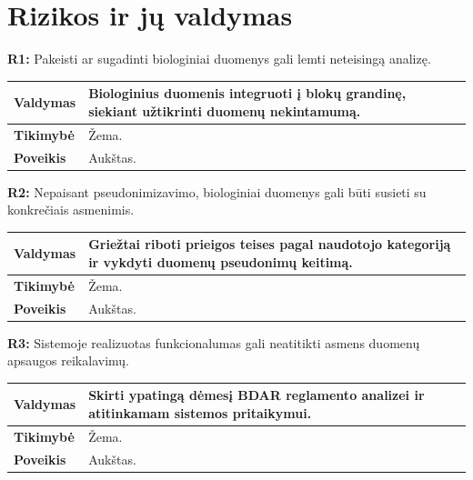 \documentclass[12pt]{article}
\begin{document}
\newpage

\section{Rizikos ir jų valdymas}
\noindent \textbf{R1:} Pakeisti ar sugadinti biologiniai duomenys gali lemti
neteisingą analizę.

\label{sec:R1}
\begin{table}[htb!]
    \captionsetup{justification=centering}
    \vskip -10pt
    \begin{tabular}{|m{3cm}|m{13.7cm}|}
        \hline
        \raggedleft \textbf{\cellcolor{deepchampagne}Valdymas} &
        Biologinius duomenis integruoti į blokų grandinę, siekiant užtikrinti
        duomenų nekintamumą. \\
        \hline
        \raggedleft \textbf{\cellcolor{deepchampagne}Tikimybė} & Žema. \\
        \hline
        \raggedleft \textbf{\cellcolor{deepchampagne}Poveikis} & Aukštas. \\
        \hline
    \end{tabular}
\end{table}

\noindent \textbf{R2:} Nepaisant pseudonimizavimo, biologiniai duomenys gali
būti susieti su konkrečiais asmenimis.

\label{sec:R2}
\begin{table}[htb!]
    \captionsetup{justification=centering}
    \vskip -10pt
    \begin{tabular}{|m{3cm}|m{13.7cm}|}
        \hline
        \raggedleft \textbf{\cellcolor{deepchampagne}Valdymas} &
        Griežtai riboti prieigos teises pagal naudotojo kategoriją ir vykdyti
        duomenų pseudonimų keitimą. \\
        \hline
        \raggedleft \textbf{\cellcolor{deepchampagne}Tikimybė} & Žema. \\
        \hline
        \raggedleft \textbf{\cellcolor{deepchampagne}Poveikis} & Aukštas. \\
        \hline
    \end{tabular}
\end{table}

\noindent \textbf{R3:} Sistemoje realizuotas funkcionalumas gali neatitikti
asmens duomenų apsaugos reikalavimų.

\label{sec:R3}
\begin{table}[htb!]
    \captionsetup{justification=centering}
    \vskip -10pt
    \begin{tabular}{|m{3cm}|m{13.7cm}|}
        \hline
        \raggedleft \textbf{\cellcolor{deepchampagne}Valdymas} &
        Skirti ypatingą dėmesį BDAR reglamento analizei ir atitinkamam sistemos
        pritaikymui. \\
        \hline
        \raggedleft \textbf{\cellcolor{deepchampagne}Tikimybė} & Žema. \\
        \hline
        \raggedleft \textbf{\cellcolor{deepchampagne}Poveikis} & Aukštas. \\
        \hline
    \end{tabular}
\end{table}
\end{document}

